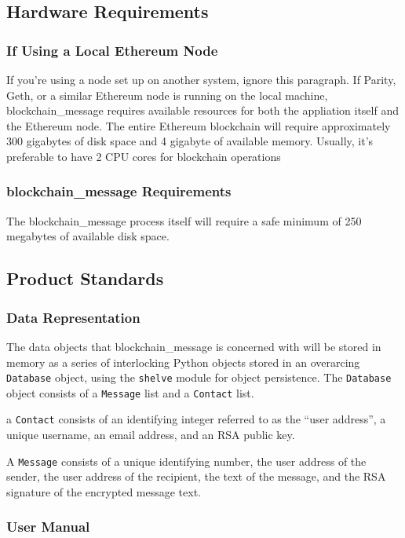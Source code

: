 \documentclass[titlepage]{report}
\begin{document}
\subsection{Hardware Requirements}
\subsubsection{If Using a Local Ethereum Node}
If you're using a node set up on another system, ignore this paragraph. If Parity, Geth, or a similar Ethereum node is running on the local machine, blockchain\_message requires available resources for both the appliation itself and the Ethereum node. The entire Ethereum blockchain will require approximately 300 gigabytes of disk space and 4 gigabyte of available memory. Usually, it's preferable to have 2 CPU cores for blockchain operations

\subsubsection{blockchain\_message Requirements}
The blockchain\_message process itself will require a safe minimum of 250 megabytes of available disk space.

\subsection{Product Standards}
\subsubsection{Data Representation}
The data objects that blockchain\_message is concerned with will be stored in memory as a series of interlocking Python objects stored in an overarcing \texttt{Database} object, using the \texttt{shelve} module for object persistence. The \texttt{Database} object consists of a \texttt{Message} list and a \texttt{Contact} list.

a \texttt{Contact} consists of an identifying integer referred to as the ``user address'', a unique username, an email address, and an RSA public key.

A \texttt{Message} consists of a unique identifying number, the user address of the sender, the user address of the recipient, the text of the message, and the RSA signature of the encrypted message text.

\subsubsection{User Manual}
\end{document}
